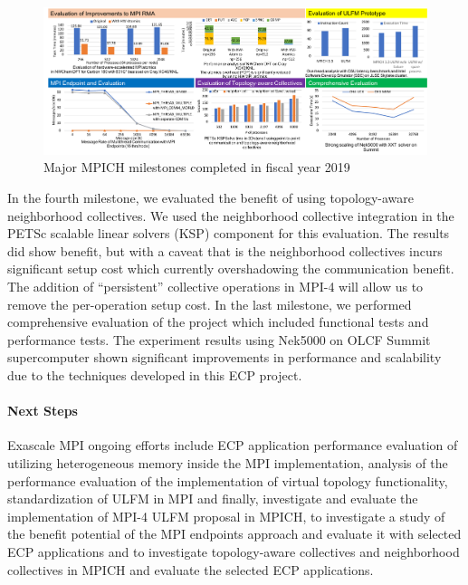 \begin{figure}[htb]
  \centering
  \includegraphics[width=6in]{projects/2.3.1-PMR/2.3.1.07-Exascale-MPI/MPICH-recent-milestones.pdf}
  \caption{\label{fig:fy19}Major MPICH milestones completed in fiscal year 2019}
\end{figure}

In the fourth milestone, we evaluated the benefit of using
topology-aware neighborhood collectives. We used the neighborhood
collective integration in the PETSc scalable linear solvers (KSP)
component for this evaluation. The results did show benefit, but with a
caveat that is the neighborhood collectives incurs significant setup
cost which currently overshadowing the communication benefit. The
addition of ``persistent'' collective operations in MPI-4 will allow us
to remove the per-operation setup cost. In the last milestone, we
performed comprehensive evaluation of the project which included
functional tests and performance tests.  The experiment results using
Nek5000 on OLCF Summit supercomputer shown significant improvements in
performance and scalability due to the techniques developed in this ECP
project.

\paragraph{Next Steps}
Exascale MPI ongoing efforts include ECP application performance evaluation of utilizing
heterogeneous memory inside the MPI implementation, analysis of the performance evaluation
of the implementation of virtual topology functionality, standardization of ULFM
in MPI and finally, investigate and evaluate the implementation of MPI-4 ULFM proposal in MPICH,
to investigate a study of the benefit potential of the MPI endpoints approach and evaluate
it with selected ECP applications and to investigate
topology-aware collectives and neighborhood collectives in MPICH and evaluate the selected ECP applications.
